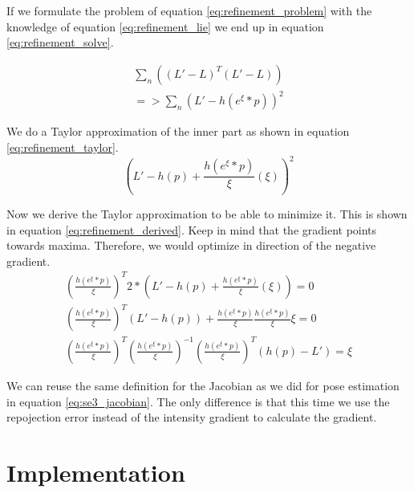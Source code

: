 \documentclass[11pt,a4paper,titlepage,oneside]{report}
\begin{document}
If we formulate the problem of equation \ref{eq:refinement_problem} with the knowledge of equation \ref{eq:refinement_lie} we end up in equation \ref{eq:refinement_solve}.

\begin{equation}\label{eq:refinement_solve}
  \begin{gathered}
    \sum_n ((L'-L)^T(L'-L))\\
    =>\sum_n (L'-h(e^{\xi}*p))^2
  \end{gathered}
\end{equation}

We do a Taylor approximation of the inner part as shown in equation \ref{eq:refinement_taylor}.
\begin{equation}\label{eq:refinement_taylor}
  (L'-h(p)+\frac{h(e^{\xi}*p)}{\xi}(\xi))^2
\end{equation}

Now we derive the Taylor approximation to be able to minimize it. This is shown in equation \ref{eq:refinement_derived}. Keep in mind that the gradient points towards maxima. Therefore, we would optimize in direction of the negative gradient.
\begin{equation}\label{eq:refinement_derived}
  \begin{gathered}
    (\frac{h(e^{\xi}*p)}{\xi})^T2*(L'-h(p)+\frac{h(e^{\xi}*p)}{\xi}(\xi))=0\\
    (\frac{h(e^{\xi}*p)}{\xi})^T(L'-h(p))+\frac{h(e^{\xi}*p)}{\xi}\frac{h(e^{\xi}*p)}{\xi}\xi=0\\
    (\frac{h(e^{\xi}*p)}{\xi})^T(\frac{h(e^{\xi}*p)}{\xi})^{-1}(\frac{h(e^{\xi}*p)}{\xi})^T(h(p)-L')=\xi
  \end{gathered}
\end{equation}

We can reuse the same definition for the Jacobian as we did for pose estimation in equation \ref{eq:se3_jacobian}. The only difference is that this time we use the repojection error instead of the intensity gradient to calculate the gradient.

\chapter{Implementation}\label{ch:implementation}
\end{document}
